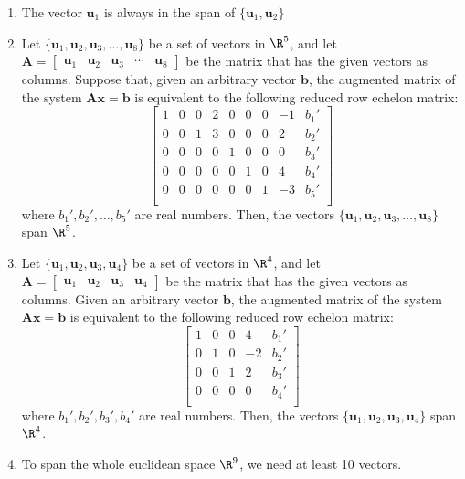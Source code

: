\documentclass[12pt]{article}
\begin{document}
\begin{enumerate}
\item The vector $\mathbf{u}_1$ is always in the span of $\{\mathbf{u}_1, \mathbf{u}_2\}$

\item Let $\{\mathbf{u}_1, \mathbf{u}_2, \mathbf{u}_3,\ldots, \mathbf{u}_8\}$ be a set of vectors in $\R^5$, and let 
$\mathbf{A}=[\begin{matrix} \mathbf{u}_1 & \mathbf{u}_2 & \mathbf{u}_3 & \cdots & \mathbf{u}_8\end{matrix}]$ be the matrix that has the given vectors as columns. 
Suppose that, given an arbitrary vector $\mathbf{b}$, the augmented matrix of the system $\mathbf{A}\mathbf{x}=\mathbf{b}$ is equivalent to the following reduced row echelon matrix: 
\[
\left[\begin{matrix}
1&0&0&2&0&0&0&-1 & b_1'\\ 
0&0&1&3&0&0&0&2 & b_2'\\ 
0&0&0&0&1&0&0&0& b_3'\\ 
0&0&0&0&0&1&0&4& b_4'\\ 
0&0&0&0&0&0&1&-3& b_5'\\ 
\end{matrix}\right]
\]
where $b_1',b_2',\ldots,b_5'$ are real numbers. Then, the vectors $\{\mathbf{u}_1, \mathbf{u}_2, \mathbf{u}_3,\ldots, \mathbf{u}_8\}$ span $\R^5$.

\item Let $\{\mathbf{u}_1, \mathbf{u}_2, \mathbf{u}_3, \mathbf{u}_4\}$ be a set of vectors in $\R^4$, and let 
$\mathbf{A}=[\begin{matrix} \mathbf{u}_1 & \mathbf{u}_2 & \mathbf{u}_3 & \mathbf{u}_4\end{matrix}]$ be the matrix that has the given vectors as columns. Given an arbitrary vector $\mathbf{b}$, the augmented matrix of the system $\mathbf{A}\mathbf{x}=\mathbf{b}$ is equivalent to the following reduced row echelon matrix: 
\[
\left[\begin{matrix}
1&0&0&4 & b_1'\\ 
0&1&0&-2& b_2'\\ 
0&0&1& 2& b_3'\\ 
0&0&0&0& b_4'\\ 
\end{matrix}\right]
\]
where $b_1',b_2',b_3',b_4'$ are real numbers. Then, the vectors $\{\mathbf{u}_1, \mathbf{u}_2, \mathbf{u}_3,\mathbf{u}_4\}$ span $\R^4$.

\item To span the whole euclidean space $\R^9$, we need at least 10 vectors.


\end{enumerate}
\end{document}
